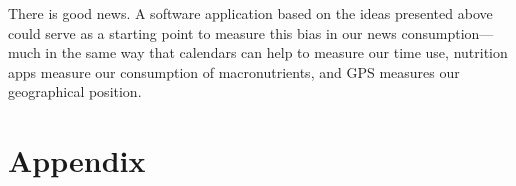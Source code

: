 \documentclass{article}
\begin{document}
	There is good news. A software application based on the ideas presented above could serve as a starting point to measure this bias in our news consumption---much in the same way that calendars can help to measure our time use, nutrition apps measure our consumption of macronutrients, and GPS measures our geographical position. 
	
	\newpage
	
	
	
	
	
	\newpage
	
	
	\section{Appendix}
	
	\begin{center}
		
		
		
		
		
		
		
	\end{center}
	
\end{document}

